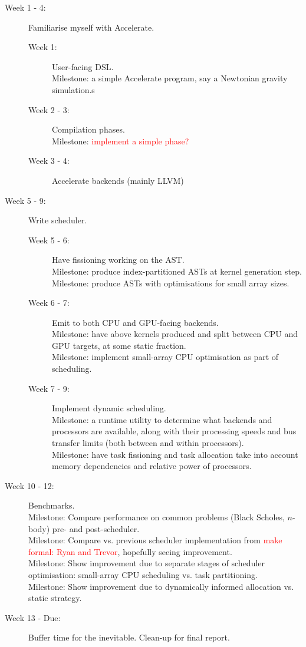 \documentclass[a4paper,12pt]{article}
\newcommand{\red}[1]{\textcolor{red}{#1}}
\begin{document}
\begin{description}
  \item[Week 1 - 4:] 
    Familiarise myself with Accelerate.
    \begin{description}
      \item[Week 1:] 
        User-facing DSL. 
        \\Milestone: a simple Accelerate program, say a Newtonian gravity simulation.s
      \item[Week 2 - 3:] 
        Compilation phases. 
        \\Milestone: \red{implement a simple phase?}
      \item[Week 3 - 4:] 
        Accelerate backends (mainly LLVM)
    \end{description}
  \item[Week 5 - 9:] 
    Write scheduler.
    \begin{description}
      \item[Week 5 - 6:] 
        Have fissioning working on the AST. 
        \\Milestone: produce index-partitioned ASTs at kernel generation step.
        \\Milestone: produce ASTs with optimisations for small array sizes.
      \item[Week 6 - 7:]
        Emit to both CPU and GPU-facing backends. 
        \\Milestone: have above kernels produced and split between CPU and GPU targets, at some static fraction.
        \\Milestone: implement small-array CPU optimisation as part of scheduling.
      \item[Week 7 - 9:]
        Implement dynamic scheduling.
        \\Milestone: a runtime utility to determine what backends and processors are available, along with their processing speeds and bus transfer limits (both between and within processors).
        \\Milestone: have task fissioning and task allocation take into account memory dependencies and relative power of processors.
    \end{description}
  \item[Week 10 - 12:]
    Benchmarks.
    \\Milestone: Compare performance on common problems (Black Scholes, $n$-body) pre- and post-scheduler.
    \\Milestone: Compare vs. previous scheduler implementation from \red{make formal: Ryan and Trevor}, hopefully seeing improvement.
    \\Milestone: Show improvement due to separate stages of scheduler optimisation: small-array CPU scheduling vs. task partitioning.
    \\Milestone: Show improvement due to dynamically informed allocation vs. static strategy.
  \item[Week 13 - Due:] Buffer time for the inevitable. Clean-up for final report.
\end{description}

\pagebreak

\footnotesize



\end{document}
